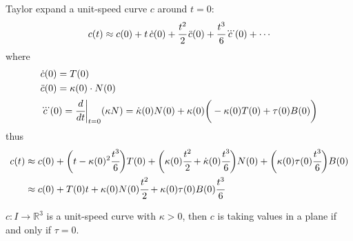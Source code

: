 \documentclass[10pt]{article}
\begin{document}
            Taylor expand a unit-speed curve $c$ around $t = 0$:
            \begin{equation*}
                \begin{aligned}
                    c(t) \approx c(0) + t\thinspace\dot{c}(0) + \cfrac{t^2}{2}\thinspace\ddot{c}(0) + \cfrac{t^3}{6}\dddot{c}(0) + \cdots
                \end{aligned}
            \end{equation*}
            where 
            \begin{equation*}
                \begin{aligned}
                    &\dot{c}(0) = T(0) \\
                    &\ddot{c}(0) = \kappa(0)\cdot N(0) \\
                    &\dddot{c}(0) = \cfrac{d}{dt}\bigg|_{t=0}(\kappa N) = \dot{\kappa}(0)N(0) + \kappa(0)\bigg( -\kappa(0)T(0) + \tau(0)B(0) \bigg)
                \end{aligned}
            \end{equation*}
            thus
            \begin{equation*}
                \begin{aligned}
                    c(t) &\approx c(0) + \bigg( t - \kappa(0)^2\cfrac{t^3}{6} \bigg)T(0) + \bigg( \kappa(0)\cfrac{t^2}{2} + \dot{\kappa}(0)\cfrac{t^3}{6}\bigg)N(0) + \bigg( \kappa(0)\tau(0)\cfrac{t^3}{6} \bigg)B(0) \\
                    &\approx c(0) + T(0)t + \kappa(0)N(0)\cfrac{t^2}{2} + \kappa(0)\tau(0)B(0)\cfrac{t^3}{6}
                \end{aligned}
            \end{equation*}
            \begin{proposition}
                $c: I\rightarrow\mathbb{R}^3$ is a unit-speed curve with $\kappa > 0$, then $c$ is taking values in a plane if and only if $\tau = 0$.
            \end{proposition}
\end{document}
